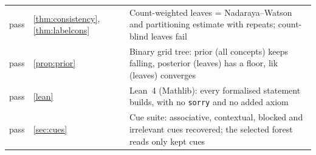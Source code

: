 \begin{tabular}{@{}llp{9.2cm}@{}}
pass & \cref{thm:consistency}, \cref{thm:labelcons} & Count-weighted leaves = Nadaraya--Watson and partitioning estimate with repeats; count-blind leaves fail\\
pass & \cref{prop:prior} & Binary grid tree: prior (all concepts) keeps falling, posterior (leaves) has a floor, lik (leaves) converges\\
pass & \cref{lean} & Lean~4 (Mathlib): every formalised statement builds, with no \texttt{sorry} and no added axiom\\
pass & \cref{sec:cues} & Cue suite: associative, contextual, blocked and irrelevant cues recovered; the selected forest reads only kept cues\\
\bottomrule\end{tabular}
